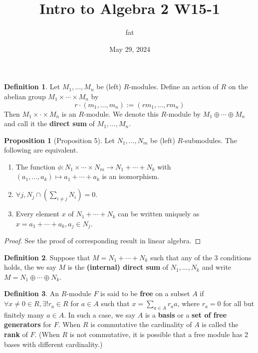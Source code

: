 \documentclass{article}
\title{Intro to Algebra 2 W15-1}
\author{fat}
\date{May 29, 2024}
\theoremstyle{definition}
\newtheorem{dfn}{Definition}
\newtheorem{prop}{Proposition}
\begin{document}
\maketitle
\thispagestyle{fancy}
\renewcommand{\footrulewidth}{0.4pt}
\cfoot{\thepage}
\renewcommand{\headrulewidth}{0.4pt}

\begin{dfn}
	Let $M_1, ..., M_n$ be (left) $R$-modules.
	Define an action of $R$ on the abelian group $M_1 \times \cdots \times M_n$ by 
	\[
		r \cdot (m_1, ..., m_n) := (r m_1, ..., r m_n)
	\]
	Then $M_1 \times \cdot \times M_n$ is an $R$-module.
	We denote this $R$-module by $M_1 \oplus \cdots \oplus M_n$ and call it the \textbf{direct sum} of $M_1, ..., M_n$.
\end{dfn}

\begin{prop}[Proposition 5]
	Let $N_1, ..., N_m$ be (left) $R$-submodules.
	The following are equivalent.
	\begin{enumerate}
		\item[(1)] The function $\phi: N_1 \times \cdots \times N_m \to N_1 + \cdots + N_k$ with $(a_1, ..., a_k) \mapsto a_1 + \cdots + a_k$ is an isomorphism.
			
		\item[(2)] $\forall j, N_j \cap (\sum_{i \neq j} N_i) = 0$.

		\item[(3)] Every element $x$ of $N_1 + \cdots + N_k$ can be written uniquely as $x = a_1 + \cdots + a_k, a_j \in N_j$.
	\end{enumerate}
\end{prop}

\begin{proof}
	See the proof of corresponding result in linear algebra.
\end{proof}

\begin{dfn}
	Suppose that $M = N_1 + \cdots + N_k$ such that any of the 3 conditions holds, the we say $M$ is the \textbf{(internal) direct sum} of $N_1, ..., N_k$ and write $M = N_1 \oplus \cdots \oplus N_k$.
\end{dfn}

\begin{dfn}
	An $R$-module $F$ is said to be \textbf{free} on a subset $A$ if $\forall x \neq 0 \in R, \exists ! r_a \in R$ for $a \in A$ such that $x = \sum_{a \in A} r_a a$, where $r_a = 0$ for all but finitely many $a \in A$.
	In such a case, we say $A$ is a \textbf{basis} or a \textbf{set of free generators} for $F$.
	When $R$ is commutative the cardinality of $A$ is called the \textbf{rank} of $F$.
	(When $R$ is not commutative, it is possible that a free module has 2 bases with different cardinality.)
\end{dfn}
\end{document}
